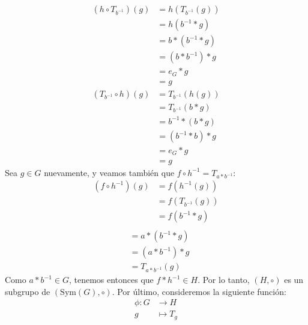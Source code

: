\documentclass[10 pt]{article}
\begin{document}
\begin{align*}
    (h \circ T_{b^{-1}})(g)&=h(T_{b^{-1}}(g)) \\
    &=h(b^{-1}*g) \\
    &=b*(b^{-1}*g) \\
    &=(b*b^{-1})*g \\
    &=e_G*g \\
    &=g
\end{align*}
\begin{align*}
    (T_{b^{-1}}\circ h)(g)&=T_{b^{-1}}(h(g)) \\
    &=T_{b^{-1}}(b*g) \\
    &=b^{-1}*(b*g) \\
    &=(b^{-1}*b)*g \\
    &=e_G*g \\
    &=g
\end{align*}
\Large{Sea $g \in G$ nuevamente, y  veamos también que $f \circ h^{-1}=T_{a*b^{-1}}$:}
\begin{align*}
    (f \circ h^{-1})(g)&=f(h^{-1}(g)) \\
    &=f(T_{b^{-1}}(g)) \\
    &=f(b^{-1}*g) \\
\end{align*}
\begin{align*}
    &=a*(b^{-1}*g) \\
    &=(a*b^{-1})*g \\
    &=T_{a*b^{-1}}(g)
\end{align*}
\Large{Como $a*b^{-1} \in G$, tenemos entonces que $f*h^{-1} \in H$. Por lo tanto, $(H,\circ)$ es un subgrupo de $(\text{Sym}(G),\circ)$. Por último, consideremos la siguiente función:}
\begin{align*}
    \phi:G &\rightarrow H \\
    g &\mapsto T_g
\end{align*}
\end{document}
